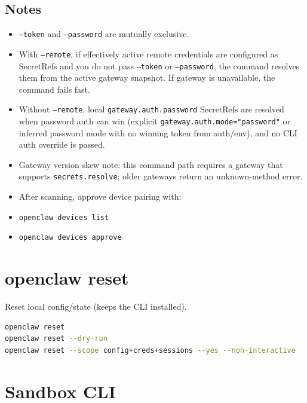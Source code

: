 \subsection{Notes}


\begin{itemize}
  \item \texttt{--token} and \texttt{--password} are mutually exclusive.
  \item With \texttt{--remote}, if effectively active remote credentials are configured as SecretRefs and you do not pass \texttt{--token} or \texttt{--password}, the command resolves them from the active gateway snapshot. If gateway is unavailable, the command fails fast.
  \item Without \texttt{--remote}, local \texttt{gateway.auth.password} SecretRefs are resolved when password auth can win (explicit \texttt{gateway.auth.mode="password"} or inferred password mode with no winning token from auth/env), and no CLI auth override is passed.
  \item Gateway version skew note: this command path requires a gateway that supports \texttt{secrets.resolve}; older gateways return an unknown-method error.
  \item After scanning, approve device pairing with:
  \item \texttt{openclaw devices list}
  \item \texttt{openclaw devices approve }
\end{itemize}



\clearpage

\section{openclaw reset}


Reset local config/state (keeps the CLI installed).

\begin{lstlisting}[language=bash]
openclaw reset
openclaw reset --dry-run
openclaw reset --scope config+creds+sessions --yes --non-interactive
\end{lstlisting}



\clearpage

\section{Sandbox CLI}


